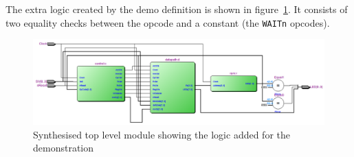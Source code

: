 The extra logic created by the demo definition is shown in figure~\ref{fig:cpudemosynth}.
It consists of two equality checks between the opcode and a constant (the \texttt{WAITn} opcodes).

\begin{figure}
\includegraphics[width=\textwidth]{Figures/cpudemosynth.png}
\caption{Synthesised top level module showing the logic added for the demonstration}
\label{fig:cpudemosynth}
\end{figure}

